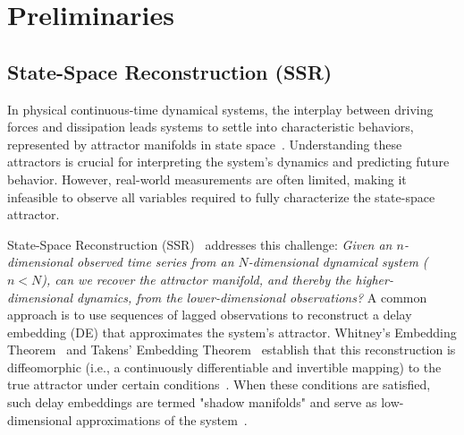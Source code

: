 \section{Preliminaries}
\label{sec:prelim}

\subsection{State-Space Reconstruction (SSR)}
\label{sec:ssr}

In physical continuous-time dynamical systems, the interplay between driving forces and dissipation leads systems to settle into characteristic behaviors, represented by attractor manifolds in state space~\citep{milnor1985concept}. Understanding these attractors is crucial for interpreting the system's dynamics and predicting future behavior. However, real-world measurements are often limited, making it infeasible to observe all variables required to fully characterize the state-space attractor.


State-Space Reconstruction (SSR)~\citep{vlachos2008state} addresses this challenge: \textit{Given an $n$-dimensional observed time series from an $N$-dimensional dynamical system ($n < N$), can we recover the attractor manifold, and thereby the higher-dimensional dynamics, from the lower-dimensional observations?} A common approach is to use sequences of lagged observations to reconstruct a delay embedding (DE) that approximates the system's attractor. Whitney's Embedding Theorem~\citep{whitney1936differentiable} and Takens' Embedding Theorem~\citep{takens2006detecting} establish that this reconstruction is diffeomorphic (i.e., a continuously differentiable and invertible mapping) to the true attractor under certain conditions~\citep{sauer1991j}. When these conditions are satisfied, such delay embeddings are termed "shadow manifolds" and serve as low-dimensional approximations of the system~\citep{sugihara2012detecting}.

